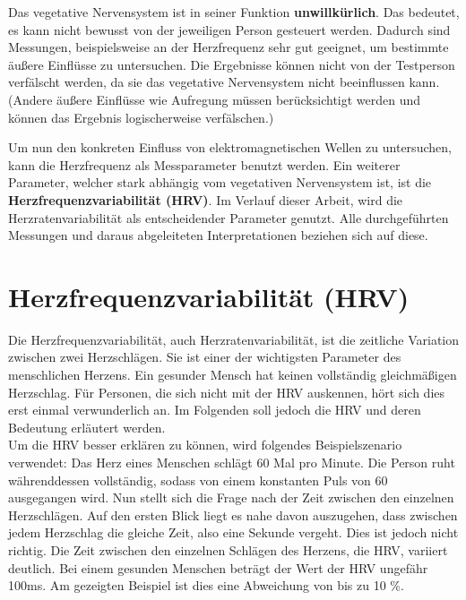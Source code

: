 Das vegetative Nervensystem ist in seiner Funktion \textbf{unwillkürlich}. Das bedeutet, es kann nicht bewusst von der jeweiligen Person gesteuert werden. Dadurch sind Messungen, beispielsweise an der Herzfrequenz sehr gut geeignet, um bestimmte äußere Einflüsse zu untersuchen.
Die Ergebnisse können nicht von der Testperson verfälscht werden, da sie das vegetative Nervensystem nicht beeinflussen kann. (Andere äußere Einflüsse wie Aufregung müssen berücksichtigt werden und können das Ergebnis logischerweise verfälschen.)\cite{veg}
		
Um nun den konkreten Einfluss von elektromagnetischen Wellen zu untersuchen, kann die Herzfrequenz als Messparameter benutzt werden. Ein weiterer Parameter, welcher stark abhängig vom vegetativen Nervensystem ist, ist die \textbf{Herzfrequenzvariabilität (HRV)}. Im Verlauf dieser Arbeit, wird die Herzratenvariabilität als entscheidender Parameter genutzt. Alle durchgeführten Messungen und daraus abgeleiteten Interpretationen beziehen sich auf diese. 


\section{Herzfrequenzvariabilität (HRV)}
Die Herzfrequenzvariabilität, auch Herzratenvariabilität, ist die zeitliche Variation zwischen zwei Herzschlägen. Sie ist einer der wichtigsten Parameter des menschlichen Herzens. Ein gesunder Mensch hat keinen vollständig gleichmäßigen Herzschlag. Für Personen, die sich nicht mit der HRV auskennen, hört sich dies erst einmal verwunderlich an. Im Folgenden soll jedoch die HRV und deren Bedeutung erläutert werden. \\
Um die HRV besser erklären zu können, wird folgendes Beispielszenario verwendet: Das Herz eines Menschen schlägt 60 Mal pro Minute. Die Person ruht währenddessen vollständig, sodass von einem konstanten Puls von 60 ausgegangen wird. Nun stellt sich die Frage nach der Zeit zwischen den einzelnen Herzschlägen. Auf den ersten Blick liegt es nahe davon auszugehen, dass zwischen jedem Herzschlag die gleiche Zeit, also eine Sekunde vergeht. Dies ist jedoch nicht richtig. Die Zeit zwischen den einzelnen Schlägen des Herzens, die HRV,  variiert deutlich.  Bei einem gesunden Menschen beträgt der Wert der HRV ungefähr 100ms. Am gezeigten Beispiel ist dies eine Abweichung von bis zu 10 \%.\cite[S.20ff]{babilon}\cite{hrv} \\

